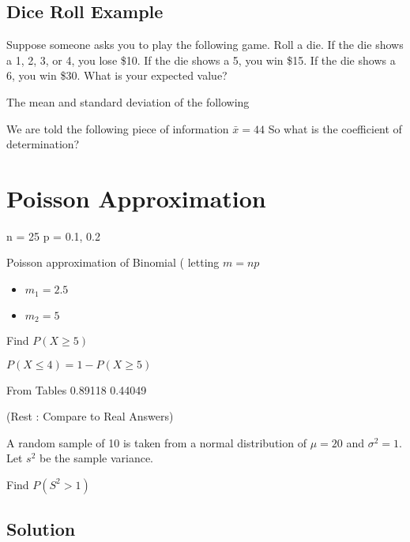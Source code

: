 \documentclass[]{report}
\begin{document}
{\subsection{Dice Roll Example}

Suppose someone asks you to play the following game. Roll a die. If the die shows a 1, 2, 3, or 4, 
you lose \$10. If the die shows a 5, you win \$15. If the die shows a 6, you win \$30. What is your expected 
value?


The mean and standard deviation of the following

We are told the following piece of information $\bar{x} = 44$
So what is the coefficient of determination?
















\section{Poisson Approximation}

n  = 25
p = 0.1, 0.2

Poisson approximation of Binomial ( letting $m=np$

\begin{itemize}
\item $m_1 = 2.5$
\item $m_2 = 5$
\end{itemize}

Find $P(X\geq 5)$ 

$ P(X\leq 4)  = 1 - P(X\geq 5) $

From Tables 
0.89118
0.44049

(Rest : Compare to Real Answers)


A random sample of 10 is taken from a normal distribution of $\mu=20$ and $\sigma^2=1$. Let $s^2$ be the sample variance.

Find $P(S^2>1)$

\subsection*{Solution}

}
\end{document}
